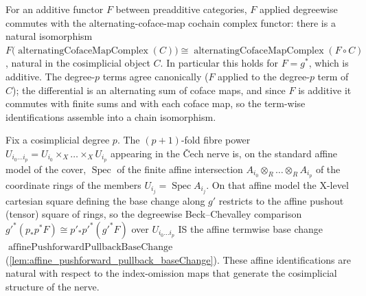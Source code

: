 \begin{lemma}\leanok
  \label{lem:pullback_commutes_alternatingCofaceMapComplex}
  For an additive functor \(F\) between preadditive categories, \(F\) applied
  degreewise commutes with the alternating-coface-map cochain complex functor: there is
  a natural isomorphism
  \(F\bigl(\operatorname{alternatingCofaceMapComplex}(C)\bigr) \cong
  \operatorname{alternatingCofaceMapComplex}(F \circ C)\), natural in the cosimplicial
  object \(C\). In particular this holds for \(F = g^*\), which is additive.
  The degree-\(p\) terms agree canonically (\(F\) applied to the
  degree-\(p\) term of \(C\)); the differential is an alternating sum of coface maps,
  and since \(F\) is additive it commutes with finite sums and with each coface map, so
  the term-wise identifications assemble into a chain isomorphism.
\end{lemma}


\begin{lemma}\leanok
  \label{lem:cech_degree_affine_baseChange}
  Fix a cosimplicial degree \(p\). The \((p+1)\)-fold fibre power
  \(U_{i_0\dots i_p} = U_{i_0} \times_X \dots \times_X U_{i_p}\) appearing in the
  {\v C}ech nerve is, on the standard affine model of the cover, \(\operatorname{Spec}\)
  of the finite affine intersection \(A_{i_0} \otimes_R \dots \otimes_R A_{i_p}\) of the
  coordinate rings of the members \(U_{i_j} = \operatorname{Spec} A_{i_j}\). On that
  affine model the X-level cartesian square defining the base change along \(g'\)
  restricts to the affine pushout (tensor) square of rings, so the degreewise
  Beck--Chevalley comparison
  \(g'^*(p_* p^* F) \cong p'_* p'^*(g'^* F)\) over \(U_{i_0\dots i_p}\) IS the affine
  termwise base change \(\operatorname{affinePushforwardPullbackBaseChange}\)
  (\cref{lem:affine_pushforward_pullback_baseChange}). These affine identifications are
  natural with respect to the index-omission maps that generate the cosimplicial
  structure of the nerve.
\end{lemma}

